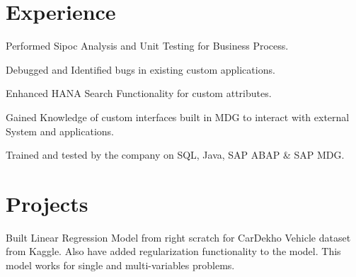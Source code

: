 \documentclass[]{deedy-resume-openfont}
\begin{document}
\begin{minipage}[t]{0.66\textwidth} 


\section{Experience}
\vspace{\topsep} %
\begin{tightemize}
\item Performed Sipoc Analysis and Unit Testing for Business Process.
\item Debugged and Identified bugs in existing custom applications. 
\item Enhanced HANA Search Functionality for custom attributes.
\item Gained Knowledge of custom interfaces built in MDG to interact with external System and applications.
\end{tightemize}
\sectionsep

\begin{tightemize}
\item Trained and tested by the company on SQL, Java, SAP ABAP \& SAP MDG.
\end{tightemize}
\sectionsep



\section{Projects}

Built Linear Regression Model from right scratch for CarDekho Vehicle dataset from Kaggle. Also have added regularization functionality to the model. This model works for single and multi-variables problems. 
\sectionsep




\end{minipage}
\end{document}
